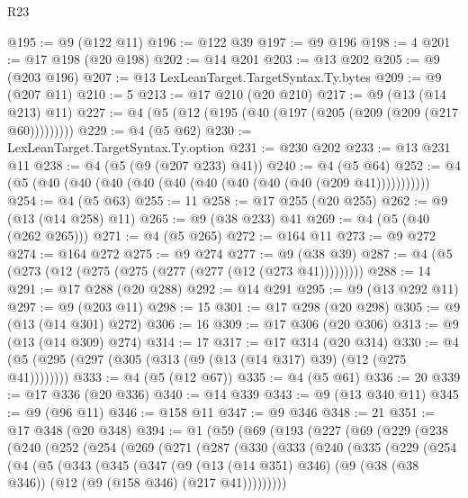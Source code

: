 \begin{lexlean}{R23}
\begin{coremodule}
@195 := @9 (@122 @11)
@196 := @122 @39
@197 := @9 @196
@198 := 4
@201 := @17 @198 (@20 @198)
@202 := @14 @201
@203 := @13 @202
@205 := @9 (@203 @196)
@207 := @13 LexLeanTarget.TargetSyntax.Ty.bytes
@209 := @9 (@207 @11)
@210 := 5
@213 := @17 @210 (@20 @210)
@217 := @9 (@13 (@14 @213) @11)
@227 := @4 (@5 (@12 (@195 (@40 (@197 (@205 (@209 (@209 (@217 @60)))))))))
@229 := @4 (@5 @62)
@230 := LexLeanTarget.TargetSyntax.Ty.option
@231 := @230 @202
@233 := @13 @231 @11
@238 := @4 (@5 (@9 (@207 @233) @41))
@240 := @4 (@5 @64)
@252 := @4 (@5 (@40 (@40 (@40 (@40 (@40 (@40 (@40 (@40 (@40 (@209 @41)))))))))))
@254 := @4 (@5 @63)
@255 := 11
@258 := @17 @255 (@20 @255)
@262 := @9 (@13 (@14 @258) @11)
@265 := @9 (@38 @233) @41
@269 := @4 (@5 (@40 (@262 @265)))
@271 := @4 (@5 @265)
@272 := @164 @11
@273 := @9 @272
@274 := @164 @272
@275 := @9 @274
@277 := @9 (@38 @39)
@287 := @4 (@5 (@273 (@12 (@275 (@275 (@277 (@277 (@12 (@273 @41)))))))))
@288 := 14
@291 := @17 @288 (@20 @288)
@292 := @14 @291
@295 := @9 (@13 @292 @11)
@297 := @9 (@203 @11)
@298 := 15
@301 := @17 @298 (@20 @298)
@305 := @9 (@13 (@14 @301) @272)
@306 := 16
@309 := @17 @306 (@20 @306)
@313 := @9 (@13 (@14 @309) @274)
@314 := 17
@317 := @17 @314 (@20 @314)
@330 := @4 (@5 (@295 (@297 (@305 (@313 (@9 (@13 (@14 @317) @39) (@12 (@275 @41))))))))
@333 := @4 (@5 (@12 @67))
@335 := @4 (@5 @61)
@336 := 20
@339 := @17 @336 (@20 @336)
@340 := @14 @339
@343 := @9 (@13 @340 @11)
@345 := @9 (@96 @11)
@346 := @158 @11
@347 := @9 @346
@348 := 21
@351 := @17 @348 (@20 @348)
@394 := @1
    (@59
      (@69
        (@193
          (@227
            (@69
              (@229
                (@238
                  (@240
                    (@252
                      (@254
                        (@269
                          (@271
                            (@287
                              (@330
                                (@333
                                  (@240
                                    (@335
                                      (@229
                                        (@254
                                          (@4
                                            (@5
                                              (@343
                                                (@345
                                                  (@347
                                                    (@9
                                                      (@13 (@14 @351) @346)
                                                      (@9
                                                        (@38 (@38 @346))
                                                        (@12 (@9 (@158 @346) (@217 @41)))))))))

\end{coremodule}
\end{lexlean}

